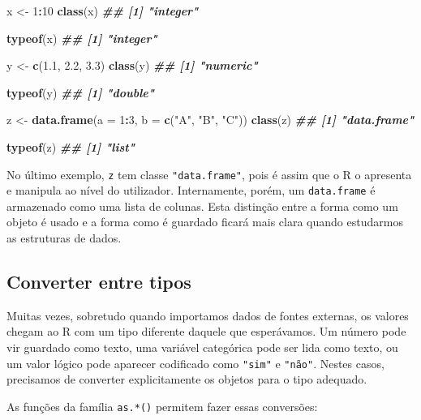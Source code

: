 \documentclass[
  portuguese,
  11pt,
  openany]{book}
\newenvironment{Shaded}{\begin{snugshade}}{\end{snugshade}}
\newcommand{\AttributeTok}[1]{\textcolor[rgb]{0.13,0.29,0.53}{#1}}
\newcommand{\DecValTok}[1]{\textcolor[rgb]{0.00,0.00,0.81}{#1}}
\newcommand{\DocumentationTok}[1]{\textcolor[rgb]{0.56,0.35,0.01}{\textbf{\textit{#1}}}}
\newcommand{\FloatTok}[1]{\textcolor[rgb]{0.00,0.00,0.81}{#1}}
\newcommand{\FunctionTok}[1]{\textcolor[rgb]{0.13,0.29,0.53}{\textbf{#1}}}
\newcommand{\NormalTok}[1]{#1}
\newcommand{\OtherTok}[1]{\textcolor[rgb]{0.56,0.35,0.01}{#1}}
\newcommand{\SpecialCharTok}[1]{\textcolor[rgb]{0.81,0.36,0.00}{\textbf{#1}}}
\newcommand{\StringTok}[1]{\textcolor[rgb]{0.31,0.60,0.02}{#1}}
\begin{document}
\begin{Shaded}
\begin{Highlighting}[]
\NormalTok{x }\OtherTok{\textless{}{-}} \DecValTok{1}\SpecialCharTok{:}\DecValTok{10}
\FunctionTok{class}\NormalTok{(x)}
\DocumentationTok{\#\# [1] "integer"}

\FunctionTok{typeof}\NormalTok{(x)}
\DocumentationTok{\#\# [1] "integer"}

\NormalTok{y }\OtherTok{\textless{}{-}} \FunctionTok{c}\NormalTok{(}\FloatTok{1.1}\NormalTok{, }\FloatTok{2.2}\NormalTok{, }\FloatTok{3.3}\NormalTok{)}
\FunctionTok{class}\NormalTok{(y)}
\DocumentationTok{\#\# [1] "numeric"}

\FunctionTok{typeof}\NormalTok{(y)}
\DocumentationTok{\#\# [1] "double"}

\NormalTok{z }\OtherTok{\textless{}{-}} \FunctionTok{data.frame}\NormalTok{(}\AttributeTok{a =} \DecValTok{1}\SpecialCharTok{:}\DecValTok{3}\NormalTok{, }\AttributeTok{b =} \FunctionTok{c}\NormalTok{(}\StringTok{"A"}\NormalTok{, }\StringTok{"B"}\NormalTok{, }\StringTok{"C"}\NormalTok{))}
\FunctionTok{class}\NormalTok{(z)}
\DocumentationTok{\#\# [1] "data.frame"}

\FunctionTok{typeof}\NormalTok{(z)}
\DocumentationTok{\#\# [1] "list"}
\end{Highlighting}
\end{Shaded}

No último exemplo, \texttt{z} tem classe \texttt{"data.frame"}, pois é assim que o R o apresenta e manipula ao nível do utilizador. Internamente, porém, um \texttt{data.frame} é armazenado como uma lista de colunas. Esta distinção entre a forma como um objeto é usado e a forma como é guardado ficará mais clara quando estudarmos as estruturas de dados.

\subsection{Converter entre tipos}\label{converter-entre-tipos}

Muitas vezes, sobretudo quando importamos dados de fontes externas, os valores chegam ao R com um tipo diferente daquele que esperávamos. Um número pode vir guardado como texto, uma variável categórica pode ser lida como texto, ou um valor lógico pode aparecer codificado como \texttt{"sim"} e \texttt{"não"}. Nestes casos, precisamos de converter explicitamente os objetos para o tipo adequado.

As funções da família \texttt{as.*()} permitem fazer essas conversões:
\end{document}

